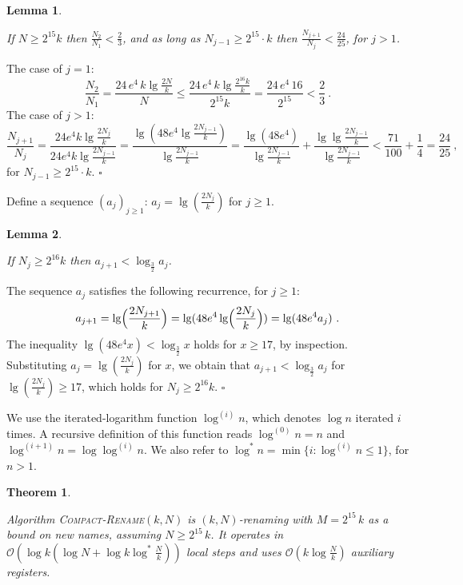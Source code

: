 \documentclass[11pt]{article}
\newcommand{\cO}{\mathcal{O}}
\newcommand{\qed}{\hfill $\square$ \smallbreak}
\newenvironment{proof}{\noindent{\bf Proof:}}{\qed}
\newtheorem{theorem}{Theorem}
\newtheorem{lemma}{Lemma}
\begin{document}
\begin{lemma}
\label{lem:shrinking-rate}

If $N\ge 2^{15}k$ then $\frac{N_{2}}{N_1}< \frac{2}{3}$, and as long as $N_{j-1}\ge 2^{15}\cdot k$ then $\frac{N_{j+1}}{N_j}<\frac{24}{25}$,  for $j> 1$.
\end{lemma}

\begin{proof}
The case of $j=1$:
\[
\frac{N_2}{N_1}
= \frac{24\,e^4\,k\lg\frac{2N}{k}}{N}
\le 
\frac{24\,e^4\,k\lg\frac{2^{16}k}{k}}{2^{15} k}
=
\frac{24\, e^4 \, 16}{2^{15}}
<\frac{2}{3}
\ .
\]
The case of $j>1$:
\[
\frac{N_{j+1}}{N_j }
= \frac{24e^4 k\lg\frac{2N_j}{k}}{24e^4 k\lg\frac{2N_{j-1}}{k}} 
= \frac{\lg(48e^4 \lg\frac{2N_{j-1}}{k})}{\lg\frac{2N_{j-1}}{k}} 
= \frac{\lg(48e^4)}{\lg\frac{2N_{j-1}}{k}} + \frac{\lg\lg\frac{2N_{j-1}}{k}}{\lg\frac{2N_{j-1}}{k}}
< \frac{71}{100} + \frac{1}{4}=\frac{24}{25}
\ ,
\]
for $N_{j-1}\ge 2^{15}\cdot k$.
\end{proof}

Define a sequence $(a_j)_{j\ge 1}$: $a_j= \lg(\frac{2N_j}{k})$ for $j\ge 1$.




\begin{lemma}
\label{lem:sequence-a}

If $N_j\ge 2^{16} k$ then $a_{j+1}<\log_\frac{3}{2} a_j$.
\end{lemma}

\begin{proof}
The sequence $a_j$ satisfies the following recurrence, for $j\ge 1$:
\[
a_{j+1} = \lg\Bigl(\frac{2N_{j+1}}{k}\Bigr)= \lg (48e^4 \lg\Bigl(\frac{2N_j}{k}\Bigr)) = \lg (48e^4a_j)
\ .
\]
The inequality $\lg (48e^4 x)<\log_\frac{3}{2} x$ holds for $x\ge 17$, by inspection.
Substituting $a_j= \lg(\frac{2N_j}{k})$ for $x$, we obtain that $a_{j+1}<\log_\frac{3}{2} a_j$ for $\lg(\frac{2N_j}{k})\ge 17$, which holds for $N_j\ge 2^{16} k$.
\end{proof}

We use the iterated-logarithm function $\log^{(i)} n$, which denotes $\log n$ iterated $i$ times.
A recursive definition of this function reads $\log^{(0)} n=n$ and $\log^{(i+1)} n= \log \log^{(i)} n$.
We also refer to $\log^\ast n =\min\{i: \log^{(i)} n\le 1\}$, for $n>1$.



\begin{theorem}
\label{thm:compact-rename}

Algorithm \textsc{Compact-Rename}$(k,N)$ is $(k,N)$-renaming with $M=2^{15}\, k$ as a bound on new names,  assuming $N\ge 2^{15}\,k$.
It operates in $\cO(\log k (\log N + \log k\log^* \frac{N}{k}))$ local steps and uses $\cO(k\log\frac{N}{k})$ auxiliary registers. 
\end{theorem}
\end{document}
